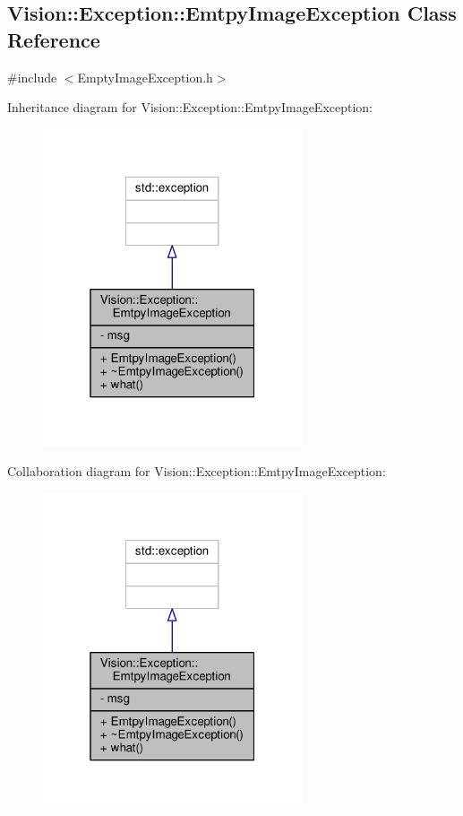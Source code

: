\hypertarget{class_vision_1_1_exception_1_1_emtpy_image_exception}{}\subsection{Vision\+:\+:Exception\+:\+:Emtpy\+Image\+Exception Class Reference}
\label{class_vision_1_1_exception_1_1_emtpy_image_exception}


{\ttfamily \#include $<$Empty\+Image\+Exception.\+h$>$}



Inheritance diagram for Vision\+:\+:Exception\+:\+:Emtpy\+Image\+Exception\+:
\nopagebreak
\begin{figure}[H]
\begin{center}
\leavevmode
\includegraphics[width=217pt]{class_vision_1_1_exception_1_1_emtpy_image_exception__inherit__graph}
\end{center}
\end{figure}


Collaboration diagram for Vision\+:\+:Exception\+:\+:Emtpy\+Image\+Exception\+:
\nopagebreak
\begin{figure}[H]
\begin{center}
\leavevmode
\includegraphics[width=217pt]{class_vision_1_1_exception_1_1_emtpy_image_exception__coll__graph}
\end{center}
\end{figure}
